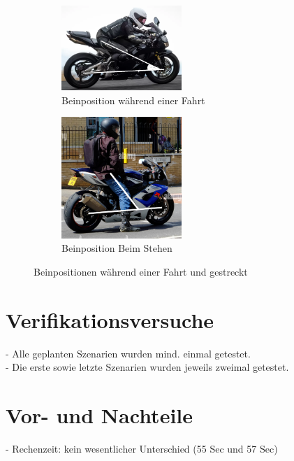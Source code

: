 \begin{figure}[H]
	\centering
	\begin{subfigure}{\textwidth}
		\centering
		\includegraphics[width=0.5\textwidth]{Bilder/MotorbikeDriving2.png}
		\caption{Beinposition während einer Fahrt}
		\label{fig:MotorbikeDriving}
	\end{subfigure}
	\hfill
	\begin{subfigure}{\textwidth}
		\centering
		\includegraphics[width=0.5\textwidth]{Bilder/MotorbikeStanding2.png}
		\caption{Beinposition Beim Stehen}
		\label{fig:MotorbikeStanding2}
	\end{subfigure}
	\caption{Beinpositionen während einer Fahrt und gestreckt}
	\label{fig:MotorbikeDrivingStanding}
\end{figure}



\section{Verifikationsversuche}

- Alle geplanten Szenarien wurden mind. einmal getestet.\\

- Die erste sowie letzte Szenarien wurden jeweils zweimal getestet.\\


\section{Vor- und Nachteile}
- Rechenzeit: kein wesentlicher Unterschied (55 Sec und 57 Sec)





 